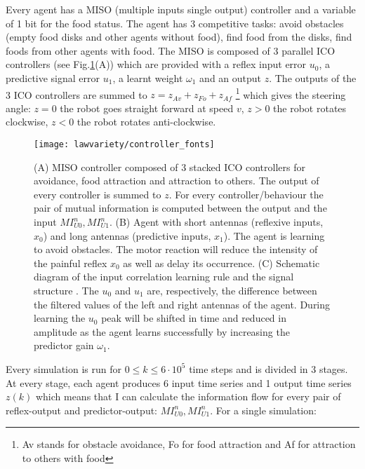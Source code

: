 Every agent has a MISO (multiple inputs single output) controller and a variable
of 1 bit for the food status. The agent has 3 competitive tasks: avoid obstacles
(empty food disks and other agents without food), find food from the disks,
find foods from other agents with food.
The MISO is composed of 3 parallel ICO controllers (see Fig.\ref{methods:ico1}(A))
which are provided with a reflex input error $u_0$, a predictive signal error $u_1$,
a learnt weight $\omega_1$ and an output $z$.
The outputs of the 3 ICO controllers are summed to $z=z_{Av}+z_{Fo}+z_{Af}$
\footnote{Av stands for obstacle avoidance, Fo for food attraction and Af for attraction to others with food}
which gives the steering angle: $z=0$ the robot goes straight forward at speed $v$,
 $z>0$ the robot rotates clockwise, $z<0$ the robot rotates anti-clockwise.
\begin{figure}
\begin{center}
\texttt{[image: lawvariety/controller\_fonts]}
\end{center}
\caption[MISO controller with triple behaviour]{(A)
MISO controller composed of 3 stacked ICO controllers for avoidance, food attraction
 and attraction to others.
The output of every controller is summed to $z$. For every controller/behaviour the
 pair of mutual information is computed
between the output and the input $MI^n_{U0},MI^n_{U1}$. (B) Agent with short antennas
 (reflexive inputs, $x_0$) and
long antennas (predictive inputs, $x_1$). The agent is learning to avoid obstacles.
The motor reaction will reduce the
intensity of the painful reflex $x_0$ as well as delay its occurrence.
(C) Schematic diagram of the input correlation learning
rule and the signal structure \citep{Porr2006ICO}. The $u_0$ and $u_1$ are,
 respectively, the difference between the filtered
 values of the left and right antennas of the agent. During learning the $u_0$
peak will be shifted in time and reduced in
amplitude as the agent learns successfully by increasing the predictor
gain $\omega_1$. \label{methods:ico1}}
\end{figure}
Every simulation is run for $0\leq k \leq 6 \cdot 10^5$ time steps and is divided in 3 stages.
At every stage, each agent produces 6 input time series and 1 output
 time series $z(k)$ which means that I can calculate the information flow for every pair of
reflex-output and predictor-output: $MI^n_{U0},MI^n_{U1}$.
For a single simulation:

